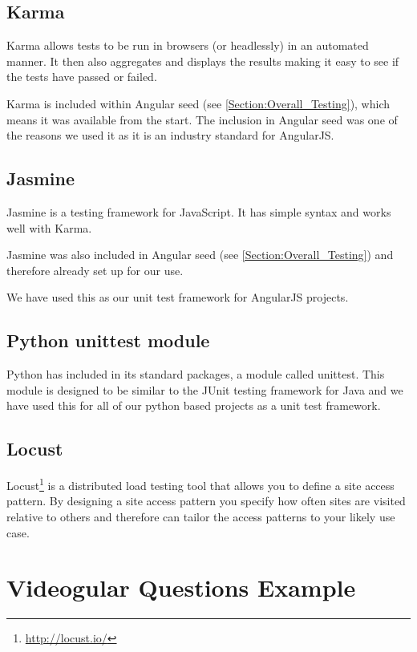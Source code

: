 \subsection{Karma}

Karma allows tests to be run in browsers (or headlessly) in an automated manner.  It then also aggregates and displays the results making it easy to see if the tests have passed or failed.

Karma is included within Angular seed (see \autoref{Section:Overall_Testing}), which means it was available from the start. The inclusion in Angular seed was one of the reasons we used it as it is an industry standard for AngularJS.

\subsection{Jasmine}

Jasmine is a testing framework for JavaScript. It has simple syntax and works well with Karma.

Jasmine was also included in Angular seed (see \autoref{Section:Overall_Testing}) and therefore already set up for our use.

We have used this as our unit test framework for AngularJS projects.

\subsection{Python unittest module}

Python has included in its standard packages, a module called unittest. This module is designed to be similar to the JUnit testing framework for Java and we have used this for all of our python based projects as a unit test framework.

\subsection{Locust}

Locust\footnote{\url{http://locust.io/}} is a distributed load testing tool that allows you to define a site access pattern. By designing a site access pattern you specify how often sites are visited relative to others and therefore can tailor the access patterns to your likely use case.

\section{Videogular Questions Example} 
\label{Section:Videogular Questions Example}

